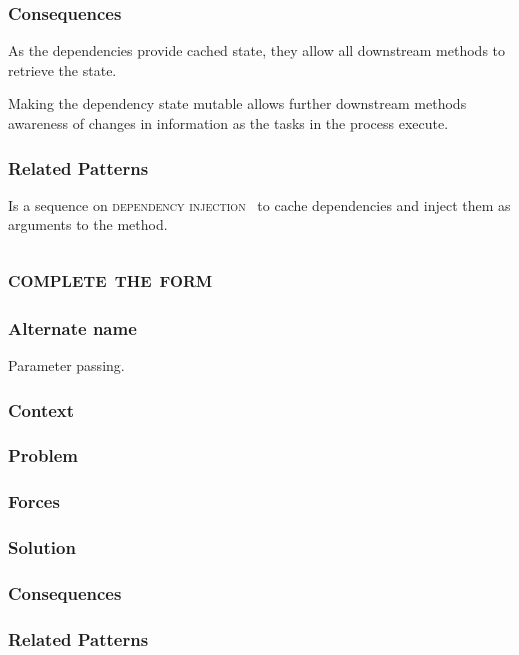 \documentclass[prodmode]{style/acmlarge}
\begin{document}
\subsubsection*{Consequences} As the dependencies provide cached state, they
allow all downstream methods to retrieve the state.

Making the dependency state mutable allows further downstream methods awareness
of changes in information as the tasks in the process execute.

\subsubsection*{Related Patterns} Is a sequence on \textsc{dependency
injection}~\cite{ioc} to cache dependencies and inject them as arguments to the
method.



\subsection{\textsc{\textbf{complete the form}}}

\subsubsection*{Alternate name} Parameter passing.

\subsubsection*{Context}

\subsubsection*{Problem}

\subsubsection*{Forces}

\subsubsection*{Solution}

\subsubsection*{Consequences}

\subsubsection*{Related Patterns}
\end{document}
